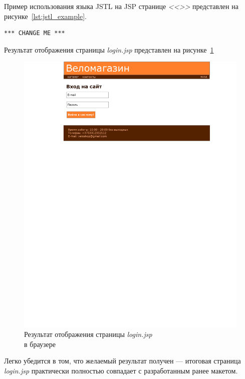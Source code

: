 Пример использования языка JSTL на JSP странице \textit{<<>>}
представлен на рисунке~\ref{lst:jstl_example}.

\begin{lstlisting}[caption=*** CHANGE ME ***, label=lst:jstl_example]
*** CHANGE ME ***
\end{lstlisting}

Результат отображения страницы \textit{login.jsp} представлен на
рисунке~\ref{fig:login_jsp}

\begin{figure}[h]
  \centering
  \includegraphics[width=120mm]{pic/login.png}
  \caption{Результат отображения страницы \textit{login.jsp} \\ в браузере}
  \label{fig:login_jsp}
\end{figure}

Легко убедится в том, что желаемый результат получен --- итоговая страница \textit{login.jsp}
практически полностью совпадает с разработанным ранее макетом.

\pagebreak
